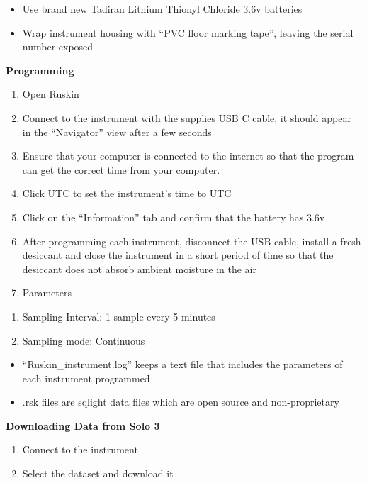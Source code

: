 \documentclass[]{book}
\begin{document}
\begin{itemize}
\item
  Use brand new Tadiran Lithium Thionyl Chloride 3.6v batteries
\item
  Wrap instrument housing with ``PVC floor marking tape'', leaving the serial number exposed
\end{itemize}

\textbf{Programming}

\begin{enumerate}
\def\labelenumi{\arabic{enumi}.}
\item
  Open Ruskin
\item
  Connect to the instrument with the supplies USB C cable, it should appear in the ``Navigator'' view after a few seconds
\item
  Ensure that your computer is connected to the internet so that the program can get the correct time from your computer.
\item
  Click UTC to set the instrument's time to UTC
\item
  Click on the ``Information'' tab and confirm that the battery has 3.6v
\item
  After programming each instrument, disconnect the USB cable, install a fresh desiccant and close the instrument in a short period of time so that the desiccant does not absorb ambient moisture in the air
\item
  Parameters
\end{enumerate}

\begin{enumerate}
\def\labelenumi{\alph{enumi}.}
\item
  Sampling Interval: 1 sample every 5 minutes
\item
  Sampling mode: Continuous
\end{enumerate}

\begin{itemize}
\item
  ``Ruskin\_instrument.log'' keeps a text file that includes the parameters of each instrument programmed
\item
  .rsk files are sqlight data files which are open source and non-proprietary
\end{itemize}

\textbf{Downloading Data from Solo 3}

\begin{enumerate}
\def\labelenumi{\arabic{enumi}.}
\item
  Connect to the instrument
\item
  Select the dataset and download it
\end{enumerate}
\end{document}

